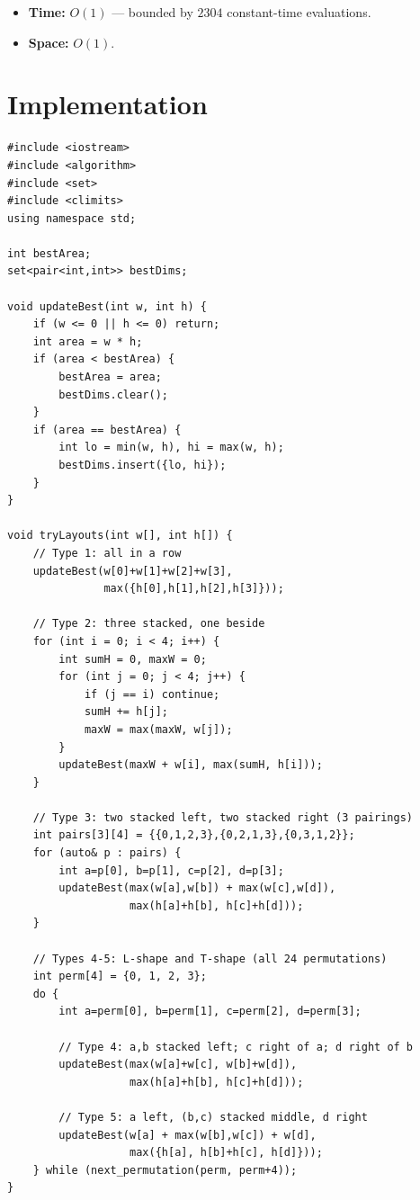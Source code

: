 \documentclass[11pt,a4paper]{article}
\begin{document}
\begin{itemize}
  \item \textbf{Time:} $O(1)$ --- bounded by $2304$ constant-time evaluations.
  \item \textbf{Space:} $O(1)$.
\end{itemize}

\section{Implementation}

\begin{lstlisting}
#include <iostream>
#include <algorithm>
#include <set>
#include <climits>
using namespace std;

int bestArea;
set<pair<int,int>> bestDims;

void updateBest(int w, int h) {
    if (w <= 0 || h <= 0) return;
    int area = w * h;
    if (area < bestArea) {
        bestArea = area;
        bestDims.clear();
    }
    if (area == bestArea) {
        int lo = min(w, h), hi = max(w, h);
        bestDims.insert({lo, hi});
    }
}

void tryLayouts(int w[], int h[]) {
    // Type 1: all in a row
    updateBest(w[0]+w[1]+w[2]+w[3],
               max({h[0],h[1],h[2],h[3]}));

    // Type 2: three stacked, one beside
    for (int i = 0; i < 4; i++) {
        int sumH = 0, maxW = 0;
        for (int j = 0; j < 4; j++) {
            if (j == i) continue;
            sumH += h[j];
            maxW = max(maxW, w[j]);
        }
        updateBest(maxW + w[i], max(sumH, h[i]));
    }

    // Type 3: two stacked left, two stacked right (3 pairings)
    int pairs[3][4] = {{0,1,2,3},{0,2,1,3},{0,3,1,2}};
    for (auto& p : pairs) {
        int a=p[0], b=p[1], c=p[2], d=p[3];
        updateBest(max(w[a],w[b]) + max(w[c],w[d]),
                   max(h[a]+h[b], h[c]+h[d]));
    }

    // Types 4-5: L-shape and T-shape (all 24 permutations)
    int perm[4] = {0, 1, 2, 3};
    do {
        int a=perm[0], b=perm[1], c=perm[2], d=perm[3];

        // Type 4: a,b stacked left; c right of a; d right of b
        updateBest(max(w[a]+w[c], w[b]+w[d]),
                   max(h[a]+h[b], h[c]+h[d]));

        // Type 5: a left, (b,c) stacked middle, d right
        updateBest(w[a] + max(w[b],w[c]) + w[d],
                   max({h[a], h[b]+h[c], h[d]}));
    } while (next_permutation(perm, perm+4));
}


\end{lstlisting}
\end{document}
